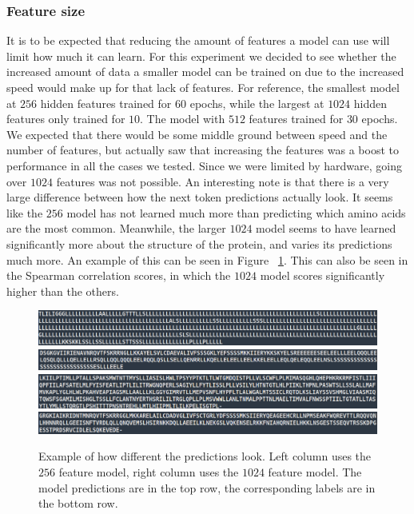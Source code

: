 \subsubsection{Feature size}
It is to be expected that reducing the amount of features a model can use will limit how much it can learn. For this experiment we decided to see whether the increased amount of data a smaller model can be trained on due to the increased speed would make up for that lack of features. For reference, the smallest model at $256$ hidden features trained for $60$ epochs, while the largest at $1024$ hidden features only trained for $10$. The model with $512$ features trained for $30$ epochs. We expected that there would be some middle ground between speed and the number of features, but actually saw that increasing the features was a boost to performance in all the cases we tested. Since we were limited by hardware, going over $1024$ features was not possible. An interesting note is that there is a very large difference between how the next token predictions actually look. It seems like the $256$ model has not learned much more than predicting which amino acids are the most common. Meanwhile, the larger $1024$ model seems to have learned significantly more about the structure of the protein, and varies its predictions much more. An example of this can be seen in Figure ~\ref{fig:predictions}. This can also be seen in the Spearman correlation scores, in which the $1024$ model scores significantly higher than the others.

\begin{figure}[!ht]
  \centering
  \includegraphics[width=0.49\linewidth]{latex/imgs/256_prediction.png}
  \includegraphics[width=0.49\linewidth]{latex/imgs/1024_prediction.png}
  \includegraphics[width=0.49\linewidth]{latex/imgs/256_labels.png}
  \includegraphics[width=0.49\linewidth]{latex/imgs/1024_labels.png}
  \caption{Example of how different the predictions look. Left column uses the $256$ feature model, right column uses the $1024$ feature model. The model predictions are in the top row, the corresponding labels are in the bottom row.}
  \label{fig:predictions}
\end{figure}


